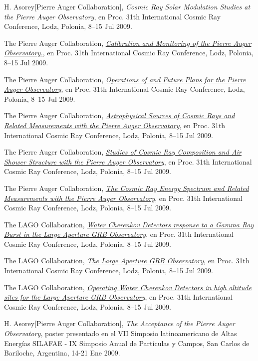 \documentclass[11pt, a4paper]{article}
\newcommand{\years}[1]{\marginnote{\scriptsize #1}}
\begin{document}
\years{2009}H. Asorey[Pierre Auger Collaboration], {\emph{Cosmic Ray Solar
Modulation Studies at the Pierre Auger Observatory}}, en Proc. 31th
International Cosmic Ray Conference, Lodz, Polonia, 8--15 Jul 2009.

\years{2009}The Pierre Auger Collaboration,
\href{http://arxiv.org/abs/0906.2358}{\emph{Calibration and Monitoring of the
Pierre Auger Observatory.}}, en Proc. 31th International Cosmic Ray Conference,
Lodz, Polonia, 8--15 Jul 2009.

\years{2009}The Pierre Auger Collaboration,
\href{http://arxiv.org/abs/0906.2354}{\emph{Operations of and Future Plans for
the Pierre Auger Observatory}}, en Proc. 31th International Cosmic Ray
Conference, Lodz, Polonia, 8--15 Jul 2009.

\years{2009}The Pierre Auger Collaboration,
\href{http://arxiv.org/abs/0906.2347}{\emph{Astrophysical Sources of Cosmic
Rays and Related Measurements with the Pierre Auger Observatory}}, en Proc.
31th International Cosmic Ray Conference, Lodz, Polonia, 8--15 Jul 2009.

\years{2009}The Pierre Auger Collaboration,
\href{http://arxiv.org/abs/0906.2319}{\emph{Studies of Cosmic Ray Composition
and Air Shower Structure with the Pierre Auger Observatory}}, en Proc. 31th
International Cosmic Ray Conference, Lodz, Polonia, 8--15 Jul 2009.

\years{2009}The Pierre Auger Collaboration,
\href{http://arxiv.org/abs/0906.2189}{\emph{The Cosmic Ray Energy Spectrum and
Related Measurements with the Pierre Auger Observatory}}, en Proc. 31th
International Cosmic Ray Conference, Lodz, Polonia, 8--15 Jul 2009.

\years{2009}The LAGO Collaboration,
\href{http://arxiv.org/abs/0906.0820}{\emph{Water Cherenkov Detectors response
to a Gamma Ray Burst in the Large Aperture GRB Observatory}}, en Proc. 31th
International Cosmic Ray Conference, Lodz, Polonia, 8--15 Jul 2009.

\years{2009}The LAGO Collaboration,
\href{http://arxiv.org/abs/0906.0816}{\emph{The Large Aperture GRB
Observatory}}, en Proc. 31th International Cosmic Ray Conference, Lodz,
Polonia, 8--15 Jul 2009.

\years{2009}The LAGO Collaboration,
\href{http://arxiv.org/abs/0906.0814}{\emph{Operating Water Cherenkov Detectors
in high altitude sites for the Large Aperture GRB Observatory}}, en Proc. 31th
International Cosmic Ray Conference, Lodz, Polonia, 8--15 Jul 2009.

\years{2009}H. Asorey[Pierre Auger Collaboration], {\emph{The Acceptance of the
Pierre Auger Observatory}}, poster presentado en el VII Simposio
latinoamericano de Altas Energías SILAFAE - IX Simposio Anual de Partículas y
Campos, San Carlos de Bariloche, Argentina, 14-21 Ene 2009.
\end{document}
